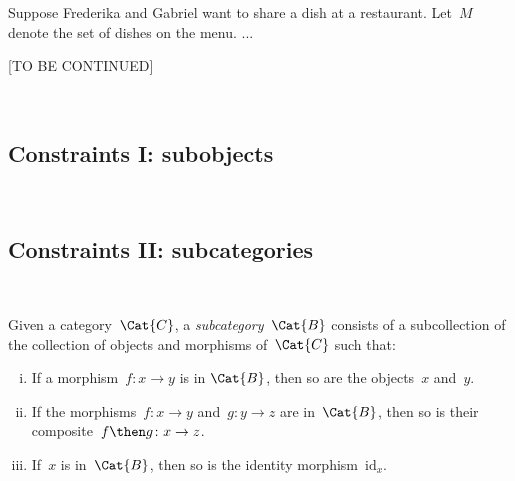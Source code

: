 \begin{example}
Suppose Frederika and Gabriel want to share a dish at a restaurant. Let~$M$ denote the set of dishes on the menu. ...

\end{example}

[TO BE CONTINUED]

\


\subsection{Constraints I: subobjects}

\


\subsection{Constraints II: subcategories}




\
\begin{shaded}
\begin{definition}[Subcategory]
\label{def:subcategory}
	Given a category~$\Cat{C}$, a \emph{subcategory}~$\Cat{B}$ consists of a subcollection of the collection of objects and morphisms of~$\Cat{C}$ such that:
	\begin{enumerate}[(i)]
	\item If a morphism~$f \colon x\to y$ is in $\Cat{B}$, then so are the objects~$x$ and~$y$.
	\item If the morphisms~$f\colon x\to y$ and~$g\colon y\to z$ are in~$\Cat{B}$, then so is their composite~$f\then g\colon x\to z$.
	\item If~$x$ is in~$\Cat{B}$, then so is the identity morphism~$\text{id}_x$.
	\end{enumerate}
\end{definition}
\end{shaded}
